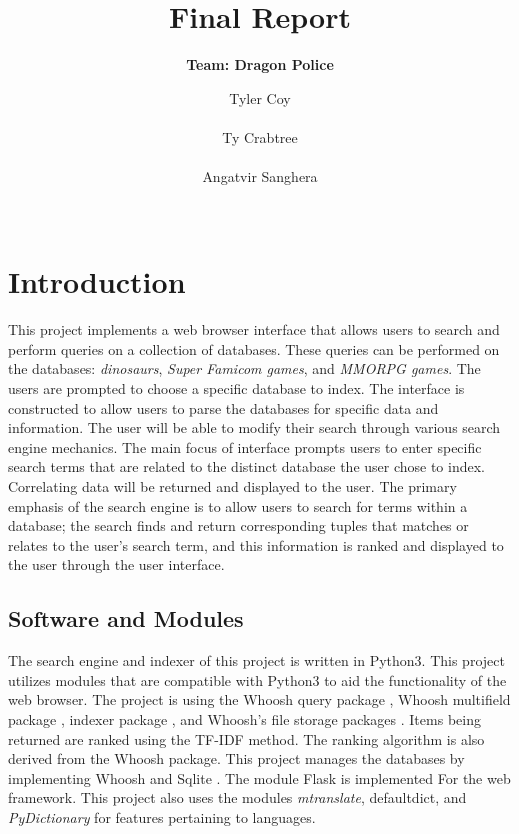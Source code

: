 \documentclass{sig-alternate-05-2015}
\begin{document}
\tracingall


\title{Final Report}

\subtitle{\textbf{Team: Dragon Police}}

\author{
\alignauthor
Tyler Coy\\
       \\
\alignauthor
Ty Crabtree\\
       \\
\alignauthor Angatvir Sanghera\\
       \\
 }



\maketitle
\section{Introduction}
This project implements a web browser interface that allows users to search and perform queries on a collection of databases. These queries can be performed on the databases: \textit{dinosaurs}, \textit{Super Famicom games}, and\textit{ MMORPG games}. The users are prompted to choose a specific database to index. The interface is constructed to allow users to parse the databases for specific data and information. The user will be able to modify their search through various search engine mechanics. The main focus of interface prompts users to enter specific search terms that are related to the distinct database the user chose to index. Correlating data will be returned and displayed to the user. The primary emphasis of the search engine is to allow users to search for terms within a database; the search finds and return corresponding tuples that matches or relates to the user's search term, and this information is ranked and displayed to the user through the user interface.

\subsection{Software and Modules}
The search engine and indexer of this project is written in Python3. This project utilizes modules that are compatible with Python3 to aid the functionality of the web browser. The project is using the Whoosh query package \cite{Whooshquery}, Whoosh multifield package \cite{Whooshquery}, indexer package \cite{indexer}, and Whoosh's file storage packages \cite{filestorage}. Items being returned are ranked using the TF-IDF \cite{rankmethod} method. The ranking algorithm is also derived from the Whoosh package. This project manages the databases by implementing Whoosh \cite{whoosh} and Sqlite \cite{sql}. The module Flask is implemented For the web framework. This project also uses the modules \textit{mtranslate}\cite{mtranslate}, defaultdict, and \textit{PyDictionary}\cite{PyDictionary} for features pertaining to languages.
\end{document}
